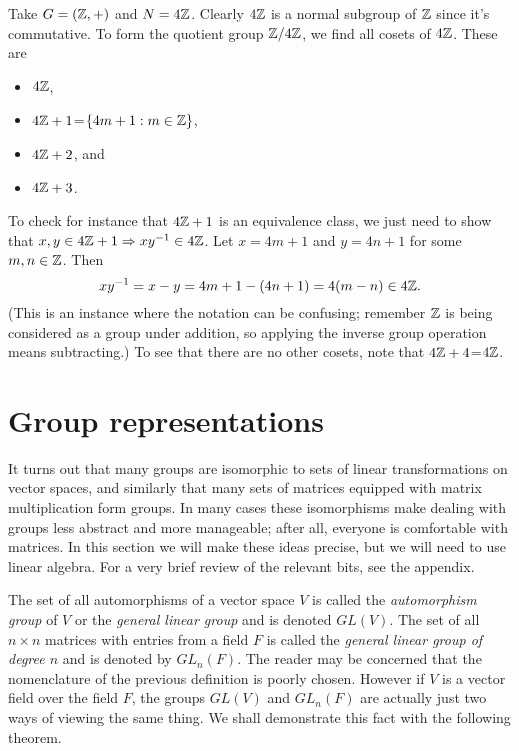 \begin{example*}{}{}
  Take $G=(\mathbb{Z},+)$ and $N=4\mathbb{Z}$. Clearly $4\mathbb{Z}$ is a
  normal subgroup of $\mathbb{Z}$ since it's commutative. To form the 
  quotient group $\mathbb{Z}/4\mathbb{Z}$, we find all cosets of $4\mathbb{Z}$.
  These are
  \begin{itemize}
    \item $4\mathbb{Z}$,
    \item $4\mathbb{Z}+1$=$\{4m+1:m\in\mathbb{Z}\}$,
    \item $4\mathbb{Z}+2$, and
    \item $4\mathbb{Z}+3$.
  \end{itemize}
  To check for instance that $4\mathbb{Z}+1$ is an equivalence class, we just
  need to show that $x,y\in4\mathbb{Z}+1\Rightarrow xy^{-1}\in4\mathbb{Z}$.
  Let $x=4m+1$ and $y=4n+1$ for some $m,n\in\mathbb{Z}$. Then
  $$xy^{-1}=x-y=4m+1-(4n+1)=4(m-n)\in4\mathbb{Z}.$$
  (This is an instance where the notation can be confusing; remember
  $\mathbb{Z}$ is being considered as a group under addition, so applying the
  inverse group operation means subtracting.) To see that there are no other
  cosets, note that $4\mathbb{Z}+4$=$4\mathbb{Z}$.
\end{example*}


\section{Group representations}

It turns out that many groups are isomorphic to sets of linear transformations
on vector spaces, and similarly that many sets of matrices equipped with matrix
multiplication form groups. In many cases these isomorphisms make dealing with
groups less abstract and more manageable; after all, everyone is comfortable
with matrices. In this section we will make these ideas precise, but we will
need to use linear algebra. For a very brief review of the relevant bits, see
the appendix.

The set of all automorphisms of a vector space $V$ is called
the {\it automorphism group} of $V$ or the 
{\it general linear group} and is
denoted $GL(V)$. The set of all $n\times n$ matrices with entries from 
a field $F$ is called the {\it general linear group of degree $n$} and 
is denoted by $GL_{n}(F)$.
The reader may be concerned that the nomenclature
of the previous definition is poorly chosen. However if $V$ is a vector field
over the field $F$, the groups $GL(V)$ and $GL_{n}(F)$ are actually just two
ways of viewing the same thing. We shall demonstrate this fact with the
following theorem. 


